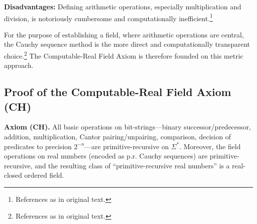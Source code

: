 \documentclass[12pt, a4paper]{article}
\begin{document}
\textbf{Disadvantages:} Defining arithmetic operations, especially multiplication and division, is notoriously cumbersome and computationally inefficient.\footnote{References as in original text.}

For the purpose of establishing a field, where arithmetic operations are central, the Cauchy sequence method is the more direct and computationally transparent choice.\footnote{References as in original text.} The Computable-Real Field Axiom is therefore founded on this metric approach.

\subsection{Proof of the Computable-Real Field Axiom (CH)}

\textbf{Axiom (CH).} All basic operations on bit-strings—binary successor/predecessor, addition, multiplication, Cantor pairing/unpairing, comparison, decision of predicates to precision \(2^{-n}\)—are primitive-recursive on \(\Sigma^*\). Moreover, the field operations on real numbers (encoded as p.r. Cauchy sequences) are primitive-recursive, and the resulting class of ``primitive-recursive real numbers'' is a real-closed ordered field.
\end{document}
